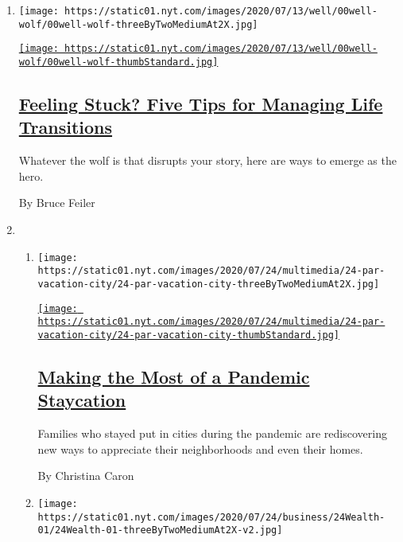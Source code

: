 \begin{enumerate}
\def\labelenumi{\arabic{enumi}.}
\item
  \texttt{[image: https://static01.nyt.com/images/2020/07/13/well/00well-wolf/00well-wolf-threeByTwoMediumAt2X.jpg]}

  \href{/2020/07/16/well/mind/managing-life-transitions.html}{\texttt{[image: https://static01.nyt.com/images/2020/07/13/well/00well-wolf/00well-wolf-thumbStandard.jpg]}}

  \hypertarget{feeling-stuck-five-tips-for-managing-life-transitions}{%
  \subsection{\texorpdfstring{\href{/2020/07/16/well/mind/managing-life-transitions.html}{Feeling
  Stuck? Five Tips for Managing Life
  Transitions}}{Feeling Stuck? Five Tips for Managing Life Transitions}}\label{feeling-stuck-five-tips-for-managing-life-transitions}}

  Whatever the wolf is that disrupts your story, here are ways to emerge
  as the hero.

  By Bruce Feiler
\item
  \begin{enumerate}
  \def\labelenumii{\arabic{enumii}.}
  \item
    \texttt{[image: https://static01.nyt.com/images/2020/07/24/multimedia/24-par-vacation-city/24-par-vacation-city-threeByTwoMediumAt2X.jpg]}

    \href{/2020/07/24/parenting/summer-staycation-coronavirus.html}{\texttt{[image: https://static01.nyt.com/images/2020/07/24/multimedia/24-par-vacation-city/24-par-vacation-city-thumbStandard.jpg]}}

    \hypertarget{making-the-most-of-a-pandemic-staycation}{%
    \subsection{\texorpdfstring{\href{/2020/07/24/parenting/summer-staycation-coronavirus.html}{Making
    the Most of a Pandemic
    Staycation}}{Making the Most of a Pandemic Staycation}}\label{making-the-most-of-a-pandemic-staycation}}

    Families who stayed put in cities during the pandemic are
    rediscovering new ways to appreciate their neighborhoods and even
    their homes.

    By Christina Caron
  \item
    \texttt{[image: https://static01.nyt.com/images/2020/07/24/business/24Wealth-01/24Wealth-01-threeByTwoMediumAt2X-v2.jpg]}


\end{enumerate}
\end{enumerate}
